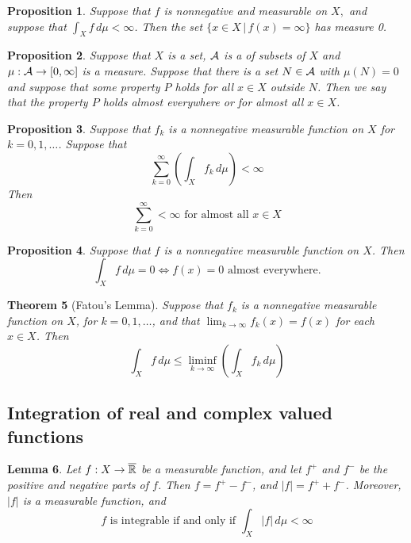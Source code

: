 \documentclass[10pt, oneside, reqno]{amsart}
\theoremstyle{plain}%
\newtheorem{thm}{Theorem}[section]
\newtheorem{lem}[thm]{Lemma}
\newtheorem{prop}[thm]{Proposition}
\theoremstyle{definition}
\theoremstyle{remark}
\newcommand{\given}{ \, | \,}
\newcommand{\dmu}{\, d \mu}
\begin{document}
\begin{prop}
	Suppose that $f$ is nonnegative and measurable on $X,$ and suppose that $\int_X f \dmu < \infty$.  Then the set $\{ x \in X \given f(x) = \infty \}$ has measure 0.
\end{prop}


\begin{prop}
	Suppose that $X$ is a set, $\mathcal{A}$ is a \sig of subsets of $X$ and $\mu: \mathcal{A} \rightarrow [0,\infty]$ is a measure. Suppose that there is a set $N \in \mathcal{A}$ with $\mu(N) = 0$ and suppose that some property $P$ holds for all $x \in X$ outside $N$.  Then we say that the property $P$ holds \emph{almost everywhere} or \emph{for almost all $x \in X$}.
\end{prop}

\begin{prop}
	Suppose that $f_k$ is a nonnegative measurable function on $X$ for $k = 0,1,\dots$.  Suppose that \[
		\sum_{k=0}^\infty \left(\int_X f_k \dmu \right) < \infty
	\]
Then \[
	\sum_{k=0}^\infty < \infty \text{ for almost all $x \in X$}
\]
\end{prop}


\begin{prop}
	Suppose that $f$ is a nonnegative measurable function on $X$.  Then \[
		\int_X f \dmu = 0 \iff f(x) = 0 \text{ almost everywhere.}
	\]
\end{prop}


\begin{thm}[Fatou's Lemma]
	Suppose that $f_k$ is a nonnegative measurable function on $X$, for $k = 0,1,\dots$, and that $\lim_{k \rightarrow \infty} f_k(x) = f(x)$ for each $x \in X$.  Then \[
		\int_X f \dmu \leq \liminf_{k \rightarrow \infty} \left( \int_X f_k \dmu \right)
	\]
	\end{thm}



\subsection{Integration of real and complex valued functions} %
\label{sub:integration_of_real_and_complex_valued_functions}
\begin{lem}
	
	Let $f: X \rightarrow \overline{\mathbb{R}}$ be a measurable function, and let $f^+$ and $f^-$ be the positive and negative parts of $f$.  Then $f = f^+ - f^-$, and $|f| = f^+ + f^-$.  Moreover, $|f|$ is a measurable function, and
	\[
		f \text{ is integrable if and only if } \int_X |f| \dmu < \infty
	\]
\end{lem}
\end{document}
